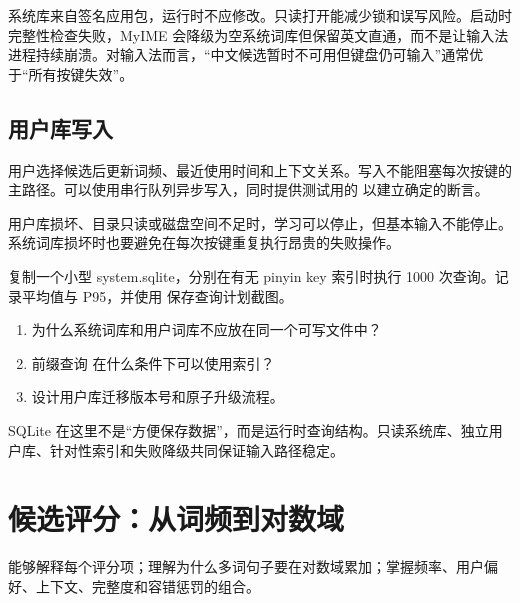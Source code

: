 系统库来自签名应用包，运行时不应修改。只读打开能减少锁和误写风险。启动时完整性检查失败，MyIME 会降级为空系统词库但保留英文直通，而不是让输入法进程持续崩溃。对输入法而言，“中文候选暂时不可用但键盘仍可输入”通常优于“所有按键失效”。

\section{用户库写入}

用户选择候选后更新词频、最近使用时间和上下文关系。写入不能阻塞每次按键的主路径。可以使用串行队列异步写入，同时提供测试用的  以建立确定的断言。



\begin{warningbox}[数据库失败必须静默降级]
用户库损坏、目录只读或磁盘空间不足时，学习可以停止，但基本输入不能停止。系统词库损坏时也要避免在每次按键重复执行昂贵的失败操作。
\end{warningbox}

\begin{lab}[查询计划]
复制一个小型 system.sqlite，分别在有无 pinyin key 索引时执行 1000 次查询。记录平均值与 P95，并使用  保存查询计划截图。
\end{lab}

\exercises
\begin{enumerate}
  \item 为什么系统词库和用户词库不应放在同一个可写文件中？
  \item 前缀查询  在什么条件下可以使用索引？
  \item 设计用户库迁移版本号和原子升级流程。
\end{enumerate}

\begin{summarybox}
SQLite 在这里不是“方便保存数据”，而是运行时查询结构。只读系统库、独立用户库、针对性索引和失败降级共同保证输入路径稳定。
\end{summarybox}


\chapter{候选评分：从词频到对数域}

\begin{goals}
能够解释每个评分项；理解为什么多词句子要在对数域累加；掌握频率、用户偏好、上下文、完整度和容错惩罚的组合。
\end{goals}

